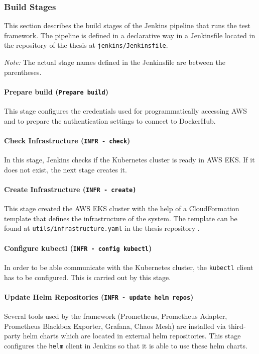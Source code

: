\subsubsection{Build Stages}

This section describes the build stages of the Jenkins pipeline that runs the test framework. The pipeline is defined in a declarative way in a Jenkinsfile located in the repository of the thesis \cite{ThesisRepo} at \texttt{jenkins/Jenkinsfile}.

\emph{Note:} The actual stage names defined in the Jenkinsfile are between the parentheses.

\paragraph{Prepare build (\texttt{Prepare build})} This stage configures the credentials used for programmatically accessing AWS and to prepare the authentication settings to connect to DockerHub.

\paragraph{Check Infrastructure (\texttt{INFR - check})} In this stage, Jenkins checks if the Kubernetes cluster is ready in AWS EKS. If it does not exist, the next stage creates it.

\paragraph{Create Infrastructure (\texttt{INFR - create)}} This stage created the AWS EKS cluster with the help of a CloudFormation template that defines the infrastructure of the system. The template can be found at \texttt{utils/infrastructure.yaml} in the thesis repository \cite{ThesisRepo}.

\paragraph{Configure kubectl (\texttt{INFR - config kubectl})} In order to be able communicate with the Kubernetes cluster, the \texttt{kubectl} client has to be configured. This is carried out by this stage.

\paragraph{Update Helm Repositories (\texttt{INFR - update helm repos})} Several tools used by the framework (Prometheus, Prometheus Adapter, Prometheus Blackbox Exporter, Grafana, Chaos Mesh) are installed via third-party helm charts which are located in external helm repositories. This stage configures the \texttt{helm} client in Jenkins so that it is able to use these helm charts.

